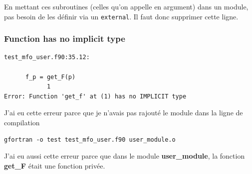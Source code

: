\documentclass[a4paper,twoside]{article}
\begin{document}
En mettant ces subroutines (celles qu'on appelle en argument) dans un module, pas besoin de les définir via un \texttt{external}. Il faut donc supprimer cette ligne.

\subsubsection{Function has no implicit type}
\begin{verbatim}
test_mfo_user.f90:35.12:

      f_p = get_F(p)
            1
Error: Function 'get_f' at (1) has no IMPLICIT type
\end{verbatim}

J'ai eu cette erreur parce que je n'avais pas rajouté le module dans la ligne de compilation 
\begin{verbatim}
gfortran -o test test_mfo_user.f90 user_module.o
\end{verbatim}

\bigskip

J'ai eu aussi cette erreur parce que dans le module \textbf{user\_module}, la fonction \textbf{get\_F} était une fonction privée.
\end{document}
